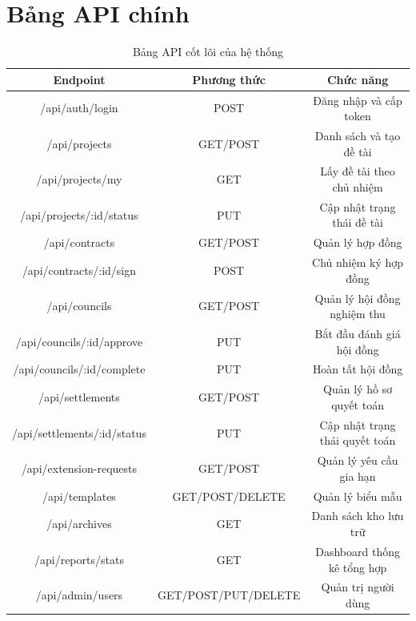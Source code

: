 \documentclass[12pt,a4paper]{report}
\begin{document}
\section{Bảng API chính}
\begin{table}[H]
\centering
\begin{tabular}{|c|c|c|}
\hline
\textbf{Endpoint} & \textbf{Phương thức} & \textbf{Chức năng} \\ \hline
/api/auth/login & POST & Đăng nhập và cấp token \\ \hline
/api/projects & GET/POST & Danh sách và tạo đề tài \\ \hline
/api/projects/my & GET & Lấy đề tài theo chủ nhiệm \\ \hline
/api/projects/:id/status & PUT & Cập nhật trạng thái đề tài \\ \hline
/api/contracts & GET/POST & Quản lý hợp đồng \\ \hline
/api/contracts/:id/sign & POST & Chủ nhiệm ký hợp đồng \\ \hline
/api/councils & GET/POST & Quản lý hội đồng nghiệm thu \\ \hline
/api/councils/:id/approve & PUT & Bắt đầu đánh giá hội đồng \\ \hline
/api/councils/:id/complete & PUT & Hoàn tất hội đồng \\ \hline
/api/settlements & GET/POST & Quản lý hồ sơ quyết toán \\ \hline
/api/settlements/:id/status & PUT & Cập nhật trạng thái quyết toán \\ \hline
/api/extension-requests & GET/POST & Quản lý yêu cầu gia hạn \\ \hline
/api/templates & GET/POST/DELETE & Quản lý biểu mẫu \\ \hline
/api/archives & GET & Danh sách kho lưu trữ \\ \hline
/api/reports/stats & GET & Dashboard thống kê tổng hợp \\ \hline
/api/admin/users & GET/POST/PUT/DELETE & Quản trị người dùng \\ \hline
\end{tabular}
\caption{Bảng API cốt lõi của hệ thống}
\end{table}
\end{document}
